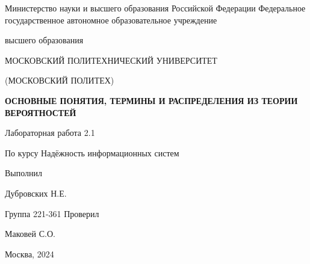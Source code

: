 \singlespacing

\newpage
\begin{center}
    Министерство науки и высшего образования Российской Федерации
    Федеральное государственное автономное образовательное учреждение

    высшего образования

    \guillemotleft МОСКОВСКИЙ ПОЛИТЕХНИЧЕСКИЙ УНИВЕРСИТЕТ\guillemotright

    (МОСКОВСКИЙ ПОЛИТЕХ)
\end{center}
\noindent
\bigbreak
\bigbreak
\bigbreak
\bigbreak
\begin{center}
    \textbf{ОСНОВНЫЕ ПОНЯТИЯ, ТЕРМИНЫ И РАСПРЕДЕЛЕНИЯ ИЗ
ТЕОРИИ ВЕРОЯТНОСТЕЙ}
    \bigskip
    \bigskip
    \bigskip
    \bigskip
    \bigskip

    Лабораторная работа 2.1

    По курсу \guillemotleft Надёжность информационных систем\guillemotright
    \bigskip

    \bigbreak
    \bigbreak
    \bigbreak
    \bigbreak
\end{center}
\noindent
\bigbreak
\bigbreak
\bigbreak
\bigbreak
\bigbreak
\bigbreak
\bigbreak
\bigbreak
\bigbreak
\bigbreak
\hfill Выполнил

\hfill Дубровских Н.Е.

\hfill Группа 221-361
\bigbreak
\bigbreak
\bigbreak
\hfill Проверил

\hfill Маковей С.О.
\vfill
\begin{center}
    Москва, 2024
\end{center}
\newpage
\onehalfspacing
